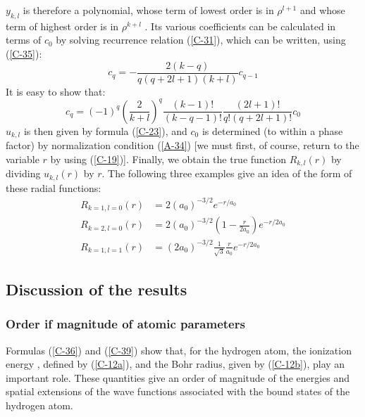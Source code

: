$y_{k,l}$ is therefore a polynomial, whose term of lowest order is in $\rho^{l+1}$ and whose term of highest order is in $\rho^{k+l}$ . Its various coefficients can be calculated in terms of $c_0$ by solving recurrence relation (\ref{C-31}), which can be written, using (\ref{C-35}):
\begin{equation}\label{C-37}
	c_q=-\frac{2(k-q)}{q(q+2l+1)(k+l)}c_{q-1}
\end{equation}
It is easy to show that:
\begin{equation}\label{C-38}
	c_q=(-1)^q\left(\frac{2}{k+l}\right)^q\frac{(k-1)!}{(k-q-1)!}\frac{(2l+1)!}{q!(q+2l+1)!}c_0
\end{equation}
$u_{k,l}$ is then given by formula (\ref{C-23}), and $c_0$ is determined (to within a phase factor) by normalization condition (\ref{A-34}) [we must first, of course, return to the variable $r$ by using (\ref{C-19})]. Finally, we obtain the true function $R_{k,l}(r)$ by dividing $u_{k,l}(r)$ by $r$. The following three examples give an idea of the form of these radial functions:
\begin{align}
	\label{C-39a}R_{k=1,l=0}(r)&=2(a_0)^{-3/2}e^{-r/a_0}\\
	\label{C-39b}R_{k=2,l=0}(r)&=2(a_0)^{-3/2}\left(1-\frac{r}{2a_0}\right)e^{-r/2a_0}\\
	R_{k=1,l=1}(r)&=(2a_0)^{-3/2}\frac{1}{\sqrt{3}}\frac{r}{a_0}e^{-r/2a_0}\label{C_39c}
\end{align}

\subsection{Discussion of the results}\label{sec:C-4}
\subsubsection{Order if magnitude of atomic parameters}
Formulas (\ref{C-36}) and (\ref{C-39}) show that, for the hydrogen atom, the ionization energy , defined by (\ref{C-12a}), and the Bohr radius, given by (\ref{C-12b}), play an important role. These quantities give an order of magnitude of the energies and spatial extensions of the wave functions associated with the bound states of the hydrogen atom.

